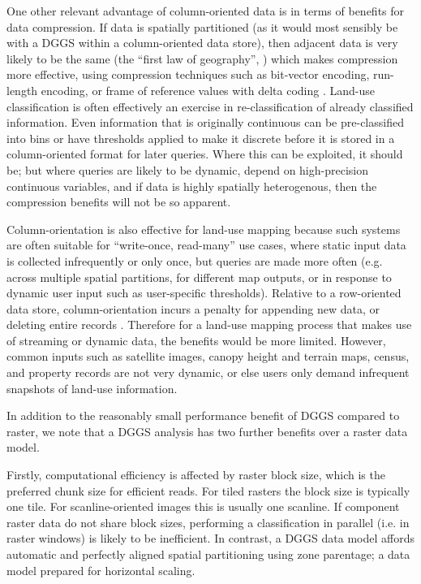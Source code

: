 \documentclass[]{interact}
\theoremstyle{plain}%
\theoremstyle{definition}
\theoremstyle{remark}
\begin{document}
One other relevant advantage of column-oriented data is in terms of benefits for data compression. If data is spatially partitioned (as it would most sensibly be with a \ac{DGGS} within a column-oriented data store), then adjacent data is very likely to be the same (the ``first law of geography'', \citet{tobler1970computer}) which makes compression more effective, using compression techniques such as bit-vector encoding, run-length encoding, or frame of reference values with delta coding \citep{abadi2013design}. Land-use classification is often effectively an exercise in re-classification of already classified information. Even information that is originally continuous can be pre-classified into bins or have thresholds applied to make it discrete before it is stored in a column-oriented format for later queries. Where this can be exploited, it should be; but where queries are likely to be dynamic, depend on high-precision continuous variables, and if data is highly spatially heterogenous, then the compression benefits will not be so apparent.

Column-orientation is also effective for land-use mapping because such systems are often suitable for ``write-once, read-many'' use cases, where static input data is collected infrequently or only once, but queries are made more often (e.g. across multiple spatial partitions, for different map outputs, or in response to dynamic user input such as user-specific thresholds). Relative to a row-oriented data store, column-orientation incurs a penalty for appending new data, or deleting entire records \citep[p.~255]{abadi2013design}. Therefore for a land-use mapping process that makes use of streaming or dynamic data, the benefits would be more limited. However, common inputs such as satellite images, canopy height and terrain maps, census, and property records are not very dynamic, or else users only demand infrequent snapshots of land-use information.

In addition to the reasonably small performance benefit of \ac{DGGS} compared to raster, we note that a \ac{DGGS} analysis has two further benefits over a raster data model.

Firstly, computational efficiency is affected by raster block size, which is the preferred chunk size for efficient reads. For tiled rasters the block size is typically one tile. For scanline-oriented images this is usually one scanline. If component raster data do not share block sizes, performing a classification in parallel (i.e. in raster windows) is likely to be inefficient. In contrast, a \ac{DGGS} data model affords automatic and perfectly aligned spatial partitioning using zone parentage; a data model prepared for horizontal scaling.
\end{document}
